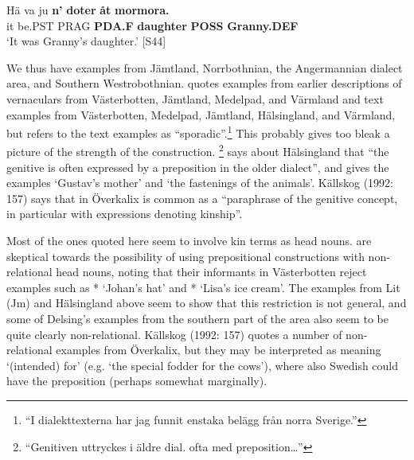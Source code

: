 \z

\item 


 \ea\label{}
\gll Hä  va  ju  \textbf{n’} \textbf{doter} \textbf{åt} \textbf{mormora.}\\


it  be.PST  PRAG  \textbf{PDA.F} \textbf{daughter} \textbf{POSS} \textbf{Granny.DEF}\\

\glt ‘It was Granny’s daughter.’ [S44]

\z

We thus have examples from Jämtland, Norrbothnian, the Angermannian dialect area, and Southern Westrobothnian. \citet[44]{Delsing2003a} quotes examples from earlier descriptions of vernaculars from Västerbotten, Jämtland, Medelpad, and Värmland and text examples from Västerbotten, Medelpad, Jämtland, Hälsingland, and Värmland, but refers to the text examples as “sporadic”.\footnote{ “I dialekttexterna har jag funnit enstaka belägg från norra Sverige.” } This probably gives too bleak a picture of the strength of the construction. \citet[61]{Hedblom1978}\footnote{ “Genitiven uttryckes i äldre dial. ofta med preposition…” } says about Hälsingland that “the genitive is often expressed by a preposition in the older dialect”, and gives the examples  ‘Gustav’s mother’ and ‘the fastenings of the animals’. Källskog (1992: 157) says that in Överkalix  is common as a “paraphrase of the genitive concept, in particular with expressions denoting kinship”. 


Most of the ones quoted here seem to involve kin terms as head nouns. \citet{BergholmEtAl1999} are skeptical towards the possibility of using prepositional constructions with non-relational head nouns, noting that their informants in Västerbotten reject examples such as * ‘Johan’s hat’ and * ‘Lisa’s ice cream’. The examples from Lit (Jm) and Hälsingland above seem to show that this restriction is not general, and some of Delsing’s examples from the southern part of the area also seem to be quite clearly non-relational. Källskog (1992: 157) quotes a number of non-relational examples from Överkalix, but they may be interpreted as meaning ‘(intended) for’ (e.g.  ‘the special fodder for the cows’), where also Swedish could have the preposition  (perhaps somewhat marginally). 

